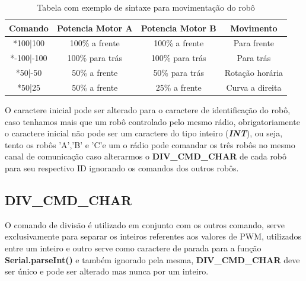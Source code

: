 \documentclass[a4paper,12pt,portuguese]{ufms-cpcx}
\begin{document}
\begin{table}[!h]
	\renewcommand{\arraystretch}{1.3}
	\centering
	\begin{tabular}{|c|cc|c|}
		\hline
		 Comando   & Potencia Motor A & Potencia Motor B &    Movimento    \\ \hline
		 *100|100  &  100\% a frente  &  100\% a frente  &   Para frente   \\
		*-100|-100 & 100\% para trás  & 100\% para trás  &    Para trás    \\
		 *50|-50   &  50\% a frente   &  50\% para trás  & Rotação horária \\
		  *50|25   &  50\% a frente   &  25\% a frente   & Curva a direita \\ \hline
	\end{tabular}
	\caption[Comandos]{Tabela com exemplo de sintaxe para movimentação do robô}
\end{table}

O caractere inicial pode ser alterado para o caractere de identificação do robô, caso tenhamos mais que um robô controlado pelo mesmo rádio, obrigatoriamente o caractere inicial não pode ser um caractere do tipo inteiro (\textbf{\textit{INT}}), ou seja, tento os robôs 'A','B' e 'C'e um o rádio pode comandar os três robôs no mesmo canal de comunicação caso alterarmos o \textbf{DIV\_CMD\_CHAR} de cada robô para seu respectivo ID ignorando os comandos dos outros robôs.

\subsection{{DIV\_CMD\_CHAR}}\label{divcmd}
O comando de divisão é utilizado em conjunto com os outros comando, serve exclusivamente para separar os inteiros referentes aos valores de PWM, utilizados entre um inteiro e outro serve como caractere de parada para a função \textbf{Serial.parseInt()} e também ignorado pela mesma, \textbf{DIV\_CMD\_CHAR} deve ser único e pode ser alterado mas nunca por um inteiro.
\end{document}
